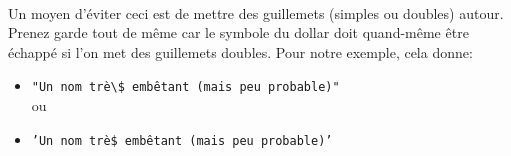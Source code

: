 \paragraph{} Un moyen d'éviter ceci est de mettre des guillemets (simples ou
doubles) autour. Prenez garde tout de même car le symbole du dollar doit
quand-même être échappé si l'on met des guillemets doubles. Pour notre exemple,
cela donne:
\\
\begin{itemize}
	\item \texttt{"Un nom trè\textbackslash\$ embêtant (mais peu probable)"}\\
	ou
	\item \texttt{'Un nom trè\$ embêtant (mais peu probable)'}
\end{itemize}

\newpage
